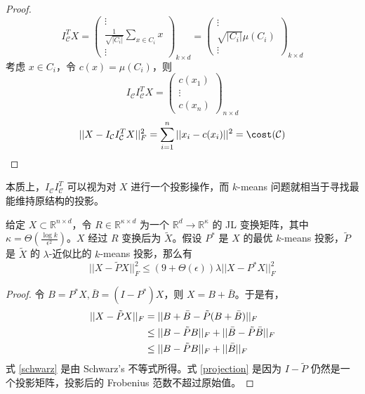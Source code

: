 \documentclass[lang=cn,newtx,10pt,scheme=chinese,chinesefont=nofont,citestyle=gb7714-2015, bibstyle=gb7714-2015]{elegantbook}
\begin{document}
\begin{refsection}
\begin{proof}
    \begin{equation*}
        I_{\mathcal{C}}^TX = \left(\begin{array}{c}
            \vdots \\
            \frac{1}{\sqrt{|C_i|}}\sum_{x\in C_i}x \\
            \vdots
        \end{array}\right)_{k\times d} = \left(\begin{array}{c}
            \vdots \\
            {\sqrt{|C_i|}}\mu(C_i) \\
            \vdots
        \end{array}\right)_{k\times d} 
    \end{equation*}
    考虑 $x\in C_i$，令 $c(x) = \mu(C_i)$，则
    \begin{equation*}
        I_{\mathcal{C}}I_{\mathcal{C}}^TX = \left(\begin{array}{c}
            c(x_1) \\
            \vdots \\
            c(x_n)
        \end{array}\right)_{n\times d}
    \end{equation*}
    \begin{equation*}
        ||X-I_{\mathcal{C}}I_{\mathcal{C}}^TX||_F^2 = \sum_{i=1}^n||x_i-c(x_i)||^2=\cost(\mathcal{C})
    \end{equation*}
\end{proof}

本质上，$I_{\mathcal{C}}I_{\mathcal{C}}^T$ 可以视为对 $X$ 进行一个投影操作，而 $k$-means 问题就相当于寻找最能维持原结构的投影。

\begin{theorem}\label{JL_kmeans2}
    给定 $X\subset \mathbb R^{n\times d}$，令 $R\in\mathbb R^{\kappa\times d}$ 为一个 $\mathbb R^d\rightarrow\mathbb R^\kappa$ 的 JL 变换矩阵，其中 $\kappa=\Theta(\frac{\log k}{\epsilon^2})$。$X$ 经过 $R$ 变换后为 $\tilde{X}$。假设 $P^*$ 是 $X$ 的最优 $k$-means 投影，$\tilde{P}$ 是 $\tilde{X}$ 的 $\lambda$-近似比的 $k$-means 投影，那么有
    \begin{equation*}
        ||X-\tilde PX||_F^2 \le (9+\Theta(\epsilon))\lambda||X-P^*X||_F^2
    \end{equation*}
\end{theorem}
\begin{proof}
    令 $B=P^*X, \bar B=(I-P^*)X$，则 $X=B+\bar B$。于是有，
    \begin{align}
        ||X-\tilde PX||_F &= ||B+\bar B - \tilde P(B+\bar B)||_F \notag \\
        &\le ||B-\tilde PB||_F + ||\bar B-\tilde P\bar B||_F \label{schwarz} \\
        &\le ||B-\tilde PB||_F + ||\bar B||_F \label{projection}
    \end{align}
    式 \ref{schwarz} 是由 Schwarz's 不等式所得。式 \ref{projection} 是因为 $I-\tilde P$ 仍然是一个投影矩阵，投影后的 Frobenius 范数不超过原始值。


\end{proof}
\end{refsection}
\end{document}
